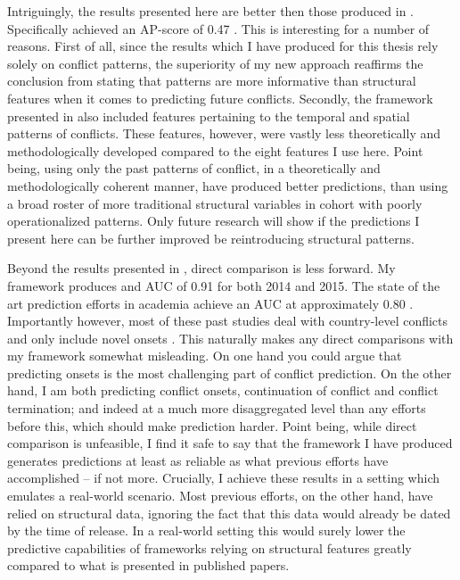 \documentclass[a4paper]{article}
\begin{document}
Intriguingly, the results presented here are better then those produced in \cite{Maase}. Specifically \cite{Maase} achieved an AP-score of 0.47 \cite[14]{Maase}. This is interesting for a number of reasons. First of all, since the results which I have produced for this thesis rely solely on conflict patterns, the superiority of my new approach reaffirms the conclusion from \cite{Maase} stating that patterns are more informative than structural features when it comes to predicting future conflicts. Secondly, the framework presented in \cite{Maase} also included features pertaining to the temporal and spatial patterns of conflicts. These features, however, were vastly less theoretically and methodologically developed compared to the eight features I use here. Point being, using only the past patterns of conflict, in a theoretically and methodologically coherent manner, have produced better predictions, than using a broad roster of more traditional structural variables in cohort with poorly operationalized patterns. Only future research will show if the predictions I present here can be further improved be reintroducing structural patterns.\par

Beyond the results presented in \cite{Maase}, direct comparison is less forward. My framework produces and AUC of 0.91 for both 2014 and 2015. The state of the art prediction efforts in academia achieve an AUC at approximately 0.80 \citep[14]{chadefaux2017conflict}. Importantly however, most of these past studies deal with country-level conflicts and only include novel onsets \citep[14]{chadefaux2017conflict}. This naturally makes any direct comparisons with my framework somewhat misleading. On one hand you could argue that predicting onsets is the most challenging part of conflict prediction. On the other hand, I am both predicting conflict onsets, continuation of conflict and conflict termination; and indeed at a much more disaggregated level than any efforts before this, which should make prediction harder. Point being, while direct comparison is unfeasible, I find it safe to say that the framework I have produced generates predictions at least as reliable as what previous efforts have accomplished -- if not more. Crucially, I achieve these results in a setting which emulates a real-world scenario. Most previous efforts, on the other hand, have relied on structural data, ignoring the fact that this data would already be dated by the time of release. In a real-world setting this would surely lower the predictive capabilities of frameworks relying on structural features greatly compared to what is presented in published papers.\par
\end{document}
